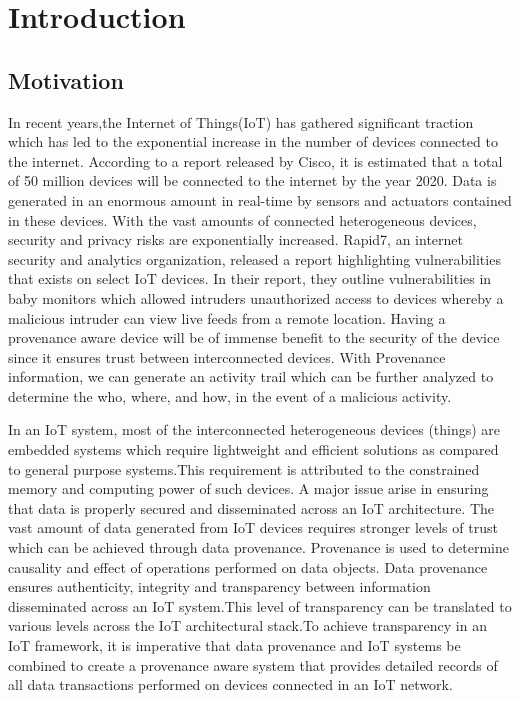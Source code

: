 \chapter{Introduction}\label{chapter:introduction}

\section{Motivation}
In recent years,the Internet of Things(IoT) has gathered significant traction which has led to the exponential increase in the number of devices connected to the internet. According to a report released by Cisco, it is estimated that a total of 50 million devices will be
connected to the internet by the year 2020. Data is generated in an enormous amount in real-time by sensors and actuators contained in these devices. With the vast amounts of connected heterogeneous devices,
security and privacy risks are exponentially increased. Rapid7, an  internet security and analytics organization, released a report highlighting vulnerabilities that exists on select IoT devices. In their report, they outline  vulnerabilities in
baby monitors which allowed intruders unauthorized access to devices
whereby a malicious intruder can view live feeds from a remote location. Having a provenance aware device will be of immense benefit to the security of the device since it ensures trust between interconnected devices. With Provenance information, we can generate an activity trail which can be further analyzed to determine the who, where, and how, in the event of a malicious activity. 
\par In an IoT system, most of the interconnected heterogeneous devices (things) are embedded systems which
require lightweight and efficient solutions as compared to general purpose
systems.This requirement is attributed to the constrained memory and computing power of such
devices. A major issue arise in ensuring that data is properly secured and
disseminated across an IoT architecture. The vast amount of data generated from IoT
devices requires stronger levels of trust which can be achieved through data
provenance. Provenance is used to determine causality and effect of 
operations performed on data objects. Data provenance ensures
authenticity, integrity and transparency between information disseminated across an
IoT system.This level of transparency can be translated to various levels across the IoT architectural stack.To achieve transparency in an IoT framework, it is imperative that data provenance and IoT systems be combined to create a provenance aware system that provides detailed records of all data
transactions performed on devices connected in an IoT network.






